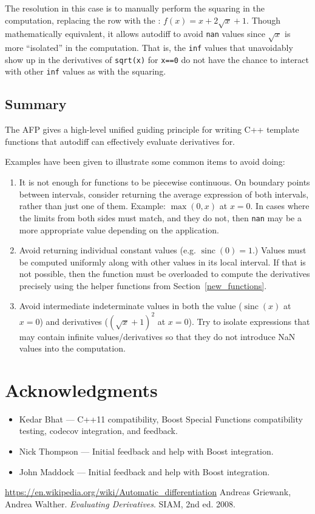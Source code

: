 \documentclass{article}
\DeclareMathOperator{\sinc}{sinc}
\begin{document}
The resolution in this case is to manually perform the squaring in the computation, replacing the  row
with the : $f(x)=x+2\sqrt{x}+1$. Though mathematically equivalent, it allows autodiff to avoid {\tt nan}
values since $\sqrt x$ is more ``isolated'' in the computation. That is, the {\tt inf} values that unavoidably
show up in the derivatives of {\tt sqrt(x)} for {\tt x==0} do not have the chance to interact with other {\tt inf}
values as with the squaring.

\subsection{Summary}

The AFP gives a high-level unified guiding principle for writing C++ template functions that autodiff can
effectively evaluate derivatives for.

Examples have been given to illustrate some common items to avoid doing:

\begin{enumerate}
\item It is not enough for functions to be piecewise continuous. On boundary points between intervals, consider
    returning the average expression of both intervals, rather than just one of them. Example: $\max(0,x)$ at $x=0$.
    In cases where the limits from both sides must match, and they do not, then {\tt nan} may be a more appropriate
    value depending on the application.
\item Avoid returning individual constant values (e.g. $\sinc(0)=1$.) Values must be computed uniformly along
    with other values in its local interval. If that is not possible, then the function must be overloaded to
    compute the derivatives precisely using the helper functions from Section~\ref{new_functions}.
\item Avoid intermediate indeterminate values in both the value ($\sinc(x)$ at $x=0$) and derivatives
    ($(\sqrt{x}+1)^2$ at $x=0$). Try to isolate expressions that may contain infinite values/derivatives so
    that they do not introduce NaN values into the computation.
\end{enumerate}

\section{Acknowledgments}

\begin{itemize}
\item Kedar Bhat --- C++11 compatibility, Boost Special Functions compatibility testing, codecov integration,
    and feedback.
\item Nick Thompson --- Initial feedback and help with Boost integration.
\item John Maddock --- Initial feedback and help with Boost integration.
\end{itemize}

\begin{thebibliography}{1}
 \url{https://en.wikipedia.org/wiki/Automatic\_differentiation}
 Andreas Griewank, Andrea Walther. \textit{Evaluating Derivatives}. SIAM, 2nd ed. 2008.
\end{thebibliography}
\end{document}

